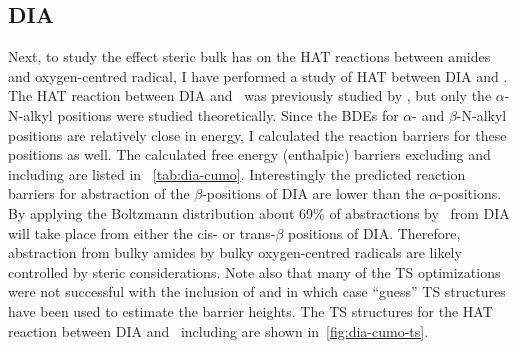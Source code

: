 \begin{doublespace}
\subsection{DIA}

Next, to study the effect steric bulk has on the HAT reactions between amides
and oxygen-centred radical, I have performed a study of HAT between DIA and
\cumo. The HAT reaction between DIA and \cumo\ was previously studied by
\citet{Salamone2014}, but only the $\alpha$-N-alkyl positions were studied
theoretically. Since the BDEs for $\alpha$- and $\beta$-N-alkyl 
positions are relatively close in energy, I calculated the reaction barriers
for these positions as well. The calculated free energy (enthalpic) barriers
excluding and including  are listed in ~\ref{tab:dia-cumo}.
Interestingly the predicted reaction barriers for abstraction of the
$\beta$-positions of DIA are lower than the $\alpha$-positions. By applying the
Boltzmann distribution about 69\% of abstractions by \cumo\ from DIA will take
place from either the cis- or trans-$\beta$ positions of DIA. Therefore,
abstraction from bulky amides by bulky oxygen-centred radicals are likely
controlled by steric considerations. Note also that many of the TS
optimizations were not successful with the inclusion of  and in which
case ``guess'' TS structures have been used to estimate the barrier heights.
The TS structures for the HAT reaction between DIA and \cumo\ including
 are shown in~\ref{fig:dia-cumo-ts}.


\end{doublespace}
